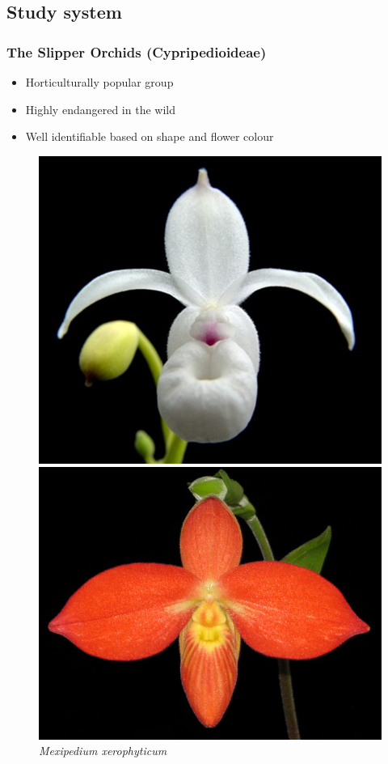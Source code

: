 \documentclass[]{beamer}
\begin{document}
	\subsection{Study system}
    \begin{frame}
        \frametitle{The Slipper Orchids (Cypripedioideae)}
        \begin{itemize}
            \item Horticulturally popular group
            \item Highly endangered in the wild
            \item Well identifiable based on shape and flower colour
        \end{itemize}

        \begin{figure}[!htb]
              \includegraphics[width=\linewidth]{Mexipedium_xerophyticum}
              \caption*{\textit{Mexipedium xerophyticum}}
            \endminipage\hfill
              \includegraphics[width=\linewidth]{Phragmipedium_besseae}

\end{figure}
\end{frame}
\end{document}
